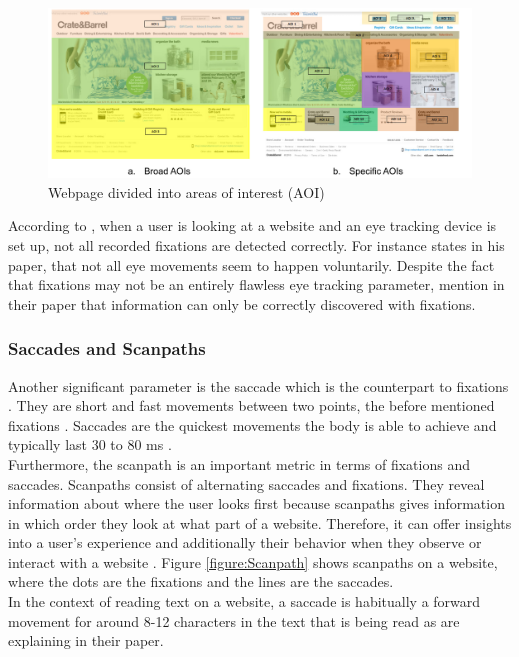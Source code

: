 \begin{figure}[t]
    \centering
    \includegraphics[width=0.75\linewidth]{images/AOI_djamasbi2014eye.png}
    \caption{
        Webpage divided into areas of interest (AOI) \autocite[48]{djamasbi2014eye}
    }
    \label{figure:AOI}
\end{figure}

According to \textcite[]{grzyb2016eye}, when a user is looking at a website and an eye tracking device is set up, not all recorded fixations are detected correctly.
For instance \textcite[]{bruneau2002eyes} states in his paper, that not all eye movements seem to happen voluntarily. 
Despite the fact that fixations may not be an entirely flawless eye tracking parameter, \textcite[]{biedert2010eyebook} mention in their paper that information can only be correctly discovered with fixations.

\subsubsection{Saccades and Scanpaths}
Another significant parameter is the saccade which is the counterpart to fixations \autocite{goldberg2002eye}. They are short and fast movements between two points, the before mentioned fixations \autocite{goldberg2002eye, beymer2007eye}. Saccades are the quickest movements the body is able to achieve and typically last 30 to 80 ms \autocite[]{blascheck2014state}. \\
Furthermore, the scanpath is an important metric in terms of fixations and saccades. Scanpaths consist of alternating saccades and fixations. They reveal information about where the user looks first because scanpaths gives information in which order they look at what part of a website. Therefore, it can offer insights into a user's experience and additionally their behavior when they observe or interact with a website \autocite[]{lorigo2008eye, blascheck2014state}. Figure \ref{figure:Scanpath} shows scanpaths on a website, where the dots are the fixations and the lines are the saccades. \\
In the context of reading text on a website, a saccade is habitually a forward movement for around 8-12 characters in the text that is being read as \textcite[]{beymer2007eye} are explaining in their paper.

